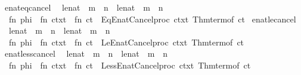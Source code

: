 \begin{isabellebody}
{\isacharparenright}\isanewline
{\isacartoucheclose}\isanewline
\isanewline
{}\isamarkupfalse%
\ enat{\isacharunderscore}eq{\isacharunderscore}cancel\isanewline
\ \ {\isacharparenleft}{\isachardoublequoteopen}{\isacharparenleft}l{\isacharcolon}{\isacharcolon}enat{\isacharparenright}\ {\isacharplus}\ m\ {\isacharequal}\ n{\isachardoublequoteclose}\ {\isacharbar}\ {\isachardoublequoteopen}{\isacharparenleft}l{\isacharcolon}{\isacharcolon}enat{\isacharparenright}\ {\isacharequal}\ m\ {\isacharplus}\ n{\isachardoublequoteclose}{\isacharparenright}\ {\isacharequal}\isanewline
\ \ {\isacartoucheopen}fn\ phi\ {\isacharequal}{\isachargreater}\ fn\ ctxt\ {\isacharequal}{\isachargreater}\ fn\ ct\ {\isacharequal}{\isachargreater}\ Eq{\isacharunderscore}Enat{\isacharunderscore}Cancel{\isachardot}proc\ ctxt\ {\isacharparenleft}Thm{\isachardot}term{\isacharunderscore}of\ ct{\isacharparenright}{\isacartoucheclose}\isanewline
\isanewline
{}\isamarkupfalse%
\ enat{\isacharunderscore}le{\isacharunderscore}cancel\isanewline
\ \ {\isacharparenleft}{\isachardoublequoteopen}{\isacharparenleft}l{\isacharcolon}{\isacharcolon}enat{\isacharparenright}\ {\isacharplus}\ m\ {\isasymle}\ n{\isachardoublequoteclose}\ {\isacharbar}\ {\isachardoublequoteopen}{\isacharparenleft}l{\isacharcolon}{\isacharcolon}enat{\isacharparenright}\ {\isasymle}\ m\ {\isacharplus}\ n{\isachardoublequoteclose}{\isacharparenright}\ {\isacharequal}\isanewline
\ \ {\isacartoucheopen}fn\ phi\ {\isacharequal}{\isachargreater}\ fn\ ctxt\ {\isacharequal}{\isachargreater}\ fn\ ct\ {\isacharequal}{\isachargreater}\ Le{\isacharunderscore}Enat{\isacharunderscore}Cancel{\isachardot}proc\ ctxt\ {\isacharparenleft}Thm{\isachardot}term{\isacharunderscore}of\ ct{\isacharparenright}{\isacartoucheclose}\isanewline
\isanewline
{}\isamarkupfalse%
\ enat{\isacharunderscore}less{\isacharunderscore}cancel\isanewline
\ \ {\isacharparenleft}{\isachardoublequoteopen}{\isacharparenleft}l{\isacharcolon}{\isacharcolon}enat{\isacharparenright}\ {\isacharplus}\ m\ {\isacharless}\ n{\isachardoublequoteclose}\ {\isacharbar}\ {\isachardoublequoteopen}{\isacharparenleft}l{\isacharcolon}{\isacharcolon}enat{\isacharparenright}\ {\isacharless}\ m\ {\isacharplus}\ n{\isachardoublequoteclose}{\isacharparenright}\ {\isacharequal}\isanewline
\ \ {\isacartoucheopen}fn\ phi\ {\isacharequal}{\isachargreater}\ fn\ ctxt\ {\isacharequal}{\isachargreater}\ fn\ ct\ {\isacharequal}{\isachargreater}\ Less{\isacharunderscore}Enat{\isacharunderscore}Cancel{\isachardot}proc\ ctxt\ {\isacharparenleft}Thm{\isachardot}term{\isacharunderscore}of\ ct{\isacharparenright}{\isacartoucheclose}%

\end{isabellebody}
